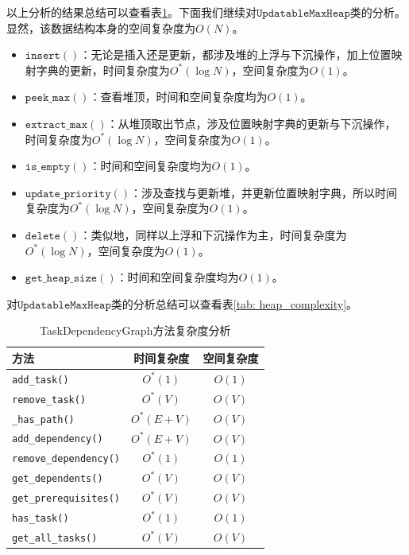 \documentclass[cn,hazy,blue,10pt,normal]{elegantnote}
\begin{document}
以上分析的结果总结可以查看表\ref{tab: task_graph complexity}。下面我们继续对$\mathtt{UpdatableMaxHeap}$类的分析。显然，该数据结构本身的空间复杂度为$O(N)$。

\begin{itemize}
    \item $\mathtt{insert()}$：无论是插入还是更新，都涉及堆的上浮与下沉操作，加上位置映射字典的更新，时间复杂度为$O^*(\log N)$，空间复杂度为$O(1)$。
    \item $\mathtt{peek\_max()}$：查看堆顶，时间和空间复杂度均为$O(1)$。
    \item $\mathtt{extract\_max()}$：从堆顶取出节点，涉及位置映射字典的更新与下沉操作，时间复杂度为$O^*(\log N)$，空间复杂度为$O(1)$。
    \item $\mathtt{is\_empty()}$：时间和空间复杂度均为$O(1)$。
    \item $\mathtt{update\_priority()}$：涉及查找与更新堆，并更新位置映射字典，所以时间复杂度为$O^*(\log N)$，空间复杂度为$O(1)$。
    \item $\mathtt{delete()}$：类似地，同样以上浮和下沉操作为主，时间复杂度为$O^*(\log N)$，空间复杂度为$O(1)$。
    \item $\mathtt{get\_heap\_size()}$：时间和空间复杂度均为$O(1)$。
\end{itemize}

对$\mathtt{UpdatableMaxHeap}$类的分析总结可以查看表\ref{tab: heap_complexity}。


\begin{table}[t]
    \centering
    \caption{TaskDependencyGraph方法复杂度分析}
    \label{tab: task_graph complexity}
    \begin{tabular}{lcc}
    \toprule
    方法  & 时间复杂度 & 空间复杂度 \\
    \midrule
    \texttt{add\_task()} & $O^*(1)$ & $O(1)$ \\
    \texttt{remove\_task()} & $O^*(V)$ & $O(V)$ \\
    \texttt{\_has\_path()} & $O^*(E + V)$ & $O(V)$ \\
    \texttt{add\_dependency()} & $O^*(E + V)$ & $O(V)$ \\
    \texttt{remove\_dependency()} & $O^*(1)$ & $O(1)$ \\
    \texttt{get\_dependents()} & $O^*(V)$ & $O(V)$ \\
    \texttt{get\_prerequisites()} & $O^*(V)$ & $O(V)$ \\
    \texttt{has\_task()} & $O^*(1)$ & $O(1)$ \\
    \texttt{get\_all\_tasks()} & $O^*(V)$ & $O(V)$ \\
    \bottomrule
    \end{tabular}
\end{table}
\end{document}
